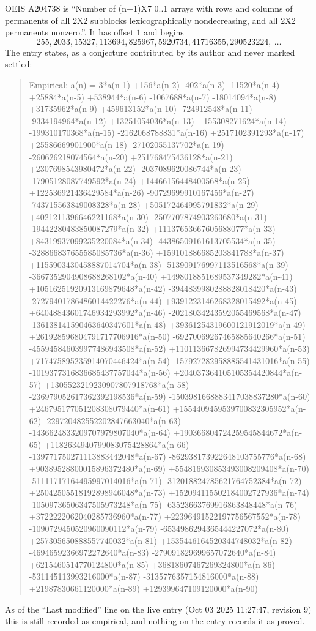\documentclass[11pt,a4paper]{article}
\theoremstyle{plain}
\theoremstyle{definition}
\begin{document}
OEIS A204738 is ``Number of (n+1)X7 0..1 arrays with rows and columns of permanents of all 2X2 subblocks lexicographically nondecreasing, and all 2X2 permanents nonzero.''. It has offset $1$ and begins
\[
255, 2033, 15327, 113694, 825967, 5920734, 41716355, 290523224,\ \dots
\]
The entry states, as a conjecture contributed by its author and never marked settled:
\begin{quote}
Empirical: a(n) = 3*a(n-1) +156*a(n-2) -402*a(n-3) -11520*a(n-4) +25884*a(n-5) +538944*a(n-6) -1067688*a(n-7) -18014094*a(n-8) +31735962*a(n-9) +459613152*a(n-10) -724912548*a(n-11) -9334194964*a(n-12) +13251054036*a(n-13) +155308271624*a(n-14) -199310170368*a(n-15) -2162068788831*a(n-16) +2517102391293*a(n-17) +25586669901900*a(n-18) -27102055137702*a(n-19) -260626218074564*a(n-20) +251768475436128*a(n-21) +2307698543980472*a(n-22) -2037089620086744*a(n-23) -17905128087749592*a(n-24) +14466156448400568*a(n-25) +122536921436429584*a(n-26) -90729699910167456*a(n-27) -743715563849008328*a(n-28) +505172464995791832*a(n-29) +4021211396646221168*a(n-30) -2507707874903263680*a(n-31) -19442280483850087279*a(n-32) +11137653667605688077*a(n-33) +84319937099235220084*a(n-34) -44386509161613705534*a(n-35) -328866837655585085736*a(n-36) +159101886685203841788*a(n-37) +1155903430458887014704*a(n-38) -513909176997113516568*a(n-39) -3667352904908688268102*a(n-40) +1498018851689537349282*a(n-41) +10516251920913169879648*a(n-42) -3944839980288828018420*a(n-43) -27279401786486014422276*a(n-44) +9391223146268328015492*a(n-45) +64048843601746934293992*a(n-46) -20218034243592055469568*a(n-47) -136138141590463640347601*a(n-48) +39361254319600121912019*a(n-49) +261928596804791717706916*a(n-50) -69270069267465885640266*a(n-51) -455945846039977486943508*a(n-52) +110113667826994734429960*a(n-53) +717475895235914070446424*a(n-54) -157927282958885541431016*a(n-55) -1019377316836685437757044*a(n-56) +204037364105105354420844*a(n-57) +1305523219230907807918768*a(n-58) -236979052617362392198536*a(n-59) -1503981668883417038837280*a(n-60) +246795177051208308079440*a(n-61) +1554409459539700832305952*a(n-62) -229720482552202847663040*a(n-63) -1436624833209707979807040*a(n-64) +190366804724259545844672*a(n-65) +1182634940799083075428864*a(n-66) -139771750271113883442048*a(n-67) -862938173922648103755776*a(n-68) +90389528800015896372480*a(n-69) +554816930853493008209408*a(n-70) -51111717164495997014016*a(n-71) -312018824785621764752384*a(n-72) +25042505518192898946048*a(n-73) +152094115502184002727936*a(n-74) -10509736506347505973248*a(n-75) -63523663769916863848448*a(n-76) +3722222062040285736960*a(n-77) +22396491522197756567552*a(n-78) -1090729450520960090112*a(n-79) -6534986294365444227072*a(n-80) +257305650888557740032*a(n-81) +1535446164520344748032*a(n-82) -46946592366972272640*a(n-83) -279091829699657072640*a(n-84) +6215460514770124800*a(n-85) +36818607467269324800*a(n-86) -531145113993216000*a(n-87) -3135776357154816000*a(n-88) +21987830661120000*a(n-89) +129399647109120000*a(n-90)
\end{quote}
As of the ``Last modified'' line on the live entry (Oct 03 2025 11:27:47, revision 9) this is still
recorded as empirical, and nothing on the entry records it as proved.
\end{document}
